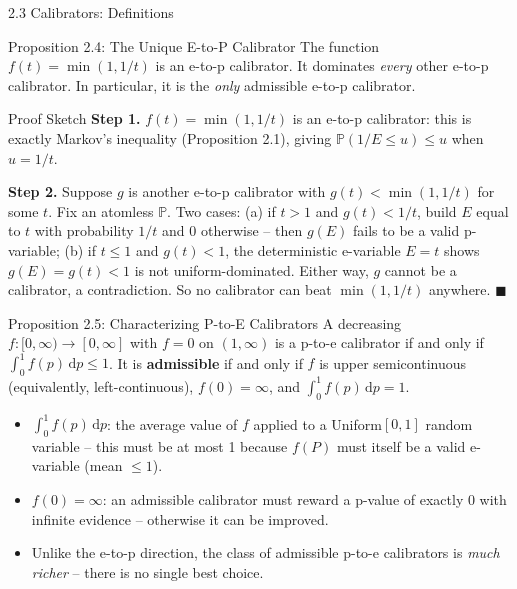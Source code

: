 \documentclass[aspectratio=169,10pt]{beamer}
\newcommand{\PP}{\mathbb{P}}
\begin{document}
\begin{frame}[allowframebreaks]{2.3 Calibrators: Definitions}
  \framebreak

  \begin{block}{Proposition 2.4: The Unique E-to-P Calibrator}
    The function $f(t)=\min(1,1/t)$ is an e-to-p calibrator. It dominates
    \emph{every} other e-to-p calibrator. In particular, it is the
    \emph{only} admissible e-to-p calibrator.
  \end{block}

  \begin{block}{Proof Sketch}
    \textbf{Step 1.} $f(t)=\min(1,1/t)$ is an e-to-p calibrator: this is
    exactly Markov's inequality (Proposition 2.1), giving
    $\PP(1/E \le u) \le u$ when $u=1/t$.

    \medskip
    \textbf{Step 2.} Suppose $g$ is another e-to-p calibrator with
    $g(t) < \min(1,1/t)$ for some $t$. Fix an atomless $\PP$. Two cases:
    (a) if $t>1$ and $g(t)<1/t$, build $E$ equal to $t$ with probability
    $1/t$ and $0$ otherwise -- then $g(E)$ fails to be a valid p-variable;
    (b) if $t\le1$ and $g(t)<1$, the deterministic e-variable $E=t$ shows
    $g(E)=g(t)<1$ is not uniform-dominated. Either way, $g$ cannot be a
    calibrator, a contradiction. So no calibrator can beat
    $\min(1,1/t)$ anywhere. $\blacksquare$
  \end{block}

  \framebreak

  \begin{block}{Proposition 2.5: Characterizing P-to-E Calibrators}
    A decreasing $f:[0,\infty)\to[0,\infty]$ with $f=0$ on $(1,\infty)$ is a
    p-to-e calibrator if and only if $\int_0^1 f(p)\,\mathrm{d}p \le 1$. It
    is \textbf{admissible} if and only if $f$ is upper semicontinuous
    (equivalently, left-continuous), $f(0)=\infty$, and
    $\int_0^1 f(p)\,\mathrm{d}p = 1$.
  \end{block}

  \begin{itemize}
    \item $\int_0^1 f(p)\,\mathrm{d}p$: the average value of $f$ applied to
      a Uniform$[0,1]$ random variable -- this must be at most 1 because
      $f(P)$ must itself be a valid e-variable (mean $\le 1$).
    \item $f(0)=\infty$: an admissible calibrator must reward a p-value of
      exactly 0 with infinite evidence -- otherwise it can be improved.
    \item Unlike the e-to-p direction, the class of admissible p-to-e
      calibrators is \emph{much richer} -- there is no single best choice.
  \end{itemize}


\end{frame}
\end{document}
